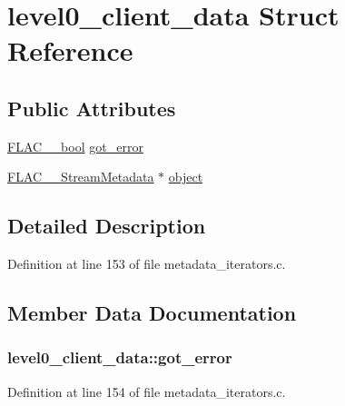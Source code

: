\hypertarget{structlevel0__client__data}{}\section{level0\+\_\+client\+\_\+data Struct Reference}
\label{structlevel0__client__data}
\subsection*{Public Attributes}
\begin{DoxyCompactItemize}
\item 
\hyperlink{ordinals_8h_a95103469f1cbd78b8cf250194985b34e}{F\+L\+A\+C\+\_\+\+\_\+bool} \hyperlink{structlevel0__client__data_aa2b0d24ba3e30cde3d2692fac27b918c}{got\+\_\+error}
\item 
\hyperlink{struct_f_l_a_c_____stream_metadata}{F\+L\+A\+C\+\_\+\+\_\+\+Stream\+Metadata} $\ast$ \hyperlink{structlevel0__client__data_aed2441efef24194cfbf70399a6f16c58}{object}
\end{DoxyCompactItemize}


\subsection{Detailed Description}


Definition at line 153 of file metadata\+\_\+iterators.\+c.



\subsection{Member Data Documentation}
\subsubsection[{\texorpdfstring{got\+\_\+error}{got_error}}]{ level0\+\_\+client\+\_\+data\+::got\+\_\+error}\hypertarget{structlevel0__client__data_aa2b0d24ba3e30cde3d2692fac27b918c}{}\label{structlevel0__client__data_aa2b0d24ba3e30cde3d2692fac27b918c}


Definition at line 154 of file metadata\+\_\+iterators.\+c.

